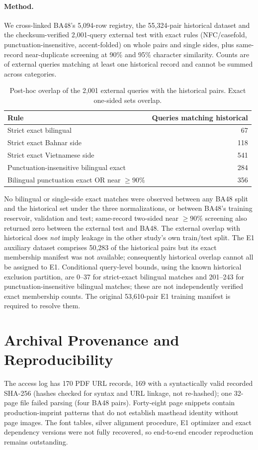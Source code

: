 \paragraph{Method.} We cross-linked BA48's 5,094-row registry, the 55,324-pair historical dataset and the checksum-verified 2,001-query external test with exact rules (NFC/casefold, punctuation-insensitive, accent-folded) on whole pairs and single sides, plus same-record near-duplicate screening at 90\% and 95\% character similarity. Counts are of external queries matching at least one historical record and cannot be summed across categories.
\begin{table}[h]
\centering\small
\caption{Post-hoc overlap of the 2,001 external queries with the historical pairs. Exact one-sided sets overlap.}
\label{tab:corpus}

\begin{tabular}{lr}
\toprule
Rule & Queries matching historical \\
\midrule
Strict exact bilingual & 67 \\
Strict exact Bahnar side & 118 \\
Strict exact Vietnamese side & 541 \\
Punctuation-insensitive bilingual exact & 284 \\
Bilingual punctuation exact OR near $\geq90\%$ & 356 \\
\bottomrule
\end{tabular}
\end{table}

No bilingual or single-side exact matches were observed between any BA48 split and the historical set under the three normalizations, or between BA48's training reservoir, validation and test; same-record two-sided near $\geq90\%$ screening also returned zero between the external test and BA48. The external overlap with historical does \emph{not} imply leakage in the other study's own train/test split. The E1 auxiliary dataset comprises 50,283 of the historical pairs but its exact membership manifest was not available; consequently historical overlap cannot all be assigned to E1. Conditional query-level bounds, using the known historical exclusion partition, are 0--37 for strict-exact bilingual matches and 201--243 for punctuation-insensitive bilingual matches; these are not independently verified exact membership counts. The original 53,610-pair E1 training manifest is required to resolve them.

\section{Archival Provenance and Reproducibility}\label{app:provenance}
The access log has 170 PDF URL records, 169 with a syntactically valid recorded SHA-256 (hashes checked for syntax and URL linkage, not re-hashed); one 32-page file failed parsing (four BA48 pairs). Forty-eight page snippets contain production-imprint patterns that do not establish masthead identity without page images. The font tables, silver alignment procedure, E1 optimizer and exact dependency versions were not fully recovered, so end-to-end encoder reproduction remains outstanding.
